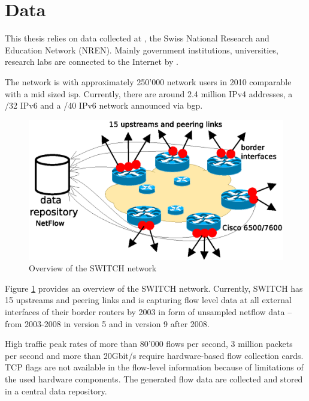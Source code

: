 \section{Data
\label{section:data}}

This thesis relies on data collected at \citet{switch}, the Swiss National Research and Education Network (NREN). 
Mainly government institutions, universities, research labs are connected to the Internet by \citet{switch}\citep{Schatzmann:Mining}.

The \citet{switch} network is with approximately 250'000 network users in 2010 comparable with a mid sized \gls{isp}. Currently, there are around 2.4 million \gls{IPv4} addresses, a /32 IPv6 and a /40 \gls{IPv6} network announced via \gls{bgp}\citep{Schatzmann:Tracing}.

\begin{figure}[b] 
	\centering
	\includegraphics[width=12cm]{images/network_overview.eps}
	\caption{Overview of the SWITCH network \citep{SchatzmanThesis2012}} 
	\label{fig:switch_nework}
\end{figure}

Figure \ref{fig:switch_nework} provides an overview of the SWITCH network. 
Currently, SWITCH has 15 upstreams and peering links and is capturing flow level data at all external interfaces of their border routers by 2003 in form of unsampled \gls{netflow} data -- from 2003-2008 in version 5 and in version 9 after 2008\citep{Schatzmann:Tracing}.

High traffic peak rates of more than 80'000 flows per second, 3 million packets per second and more than 20Gbit/s require hardware-based flow collection cards\citep{Schatzmann:Tracing}. 
\gls{TCP} flags are not available in the flow-level information because of limitations of the used hardware components\citep{Schatzmann:Tracing}. 
The generated flow data are collected and stored in a central data repository.

